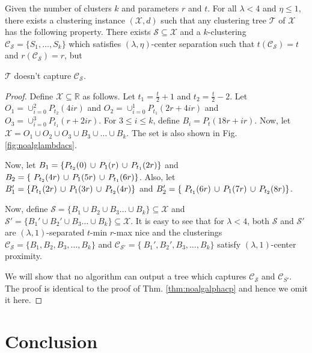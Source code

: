 \documentclass[anon,12pt]{colt2016} %
\newcommand{\mc}{\mathcal}
\begin{document}
\begin{theorem}
Given the number of clusters $k$ and parameters $r$ and $t$. For all $\lambda < 4$ and $\eta \le 1$, there exists a clustering instance $(\mc X , d)$ such that any clustering tree $\mc T$ of $\mc X$ has the following property. There exists $\mc S \subseteq \mc X$ and a $k$-clustering $\mc C_{\mc S} = \{S_1, \ldots, S_k\}$ which satisfies $(\lambda, \eta)$-center separation such that $t(\mc C_{\mc S}) = t$ and $r(\mc C_{\mc S}) = r$, but

$\mc T$ doesn't capture $\mc C_{\mc S}$.
\end{theorem}

\begin{proof}
Define $\mc X \subseteq \mathbb{R}$ as follows. Let $t_1 = \frac{t}{2}+1$ and $t_2 = \frac{t}{2}-2$. Let $O_1 = \cup_{i=0}^2 P_{t_2}(4ir)$ and $O_2 = \cup_{i=0}^1 P_{t_1}(2r+4ir)$ and $O_3 = \cup_{i=0}^3 P_{t_1}(r+2ir)$. For $3\le i\le k$, define $B_i = P_t(18r+ir)$. Now, let $\mc X = O_1 \cup O_2 \cup O_3 \cup B_3 \cup \ldots \cup B_k$. The set is also shown in Fig. \ref{fig:noalglambdacs}.

Now, let $B_1 = \{P_{t_2}(0) \thinspace\cup\thinspace  P_{1}(r) \thinspace\cup\thinspace P_{t_1}(2r) \}$ and $B_2 = \{\ P_{t_2}(4r) \thinspace\cup\thinspace P_{1}(5r)\thinspace\cup\thinspace P_{t_1}(6r)\}$. Also, let $B_1' = \{P_{t_1}(2r) \thinspace\cup\thinspace  P_{1}(3r) \thinspace\cup\thinspace P_{t_2}(4r) \}$ and $B_2' = \{\ P_{t_1}(6r) \thinspace\cup\thinspace P_{1}(7r)\thinspace\cup\thinspace P_{t_2}(8r)\}$.

Now, define $\mc S = \{B_1 \cup B_2 \cup B_3\ldots \cup B_k\} \subseteq \mc X$ and $\mc S' = \{B_1' \cup B_2' \cup B_3\ldots \cup B_k\} \subseteq \mc X$. It is easy to see that for $\lambda < 4$, both $\mc S$ and $\mc S'$ are $(\lambda, 1)$-separated $t$-min $r$-max nice and the clusterings $\mc C_{\mc S} = \{B_1, B_2, B_3, \ldots, B_k\}$ and $\mc C_{\mc S'} = \{\ B_1', B_2', B_3, \ldots, B_k\}$ satisfy $(\lambda, 1)$-center proximity. 

We will show that no algorithm can output a tree which captures $\mc C_{\mc S}$ and $\mc C_{S'}$. The proof is identical to the proof of Thm. \ref{thm:noalgalphacp} and hence we omit it here.
\end{proof}


\section{Conclusion}
\label{sec:conc}
\end{document}
